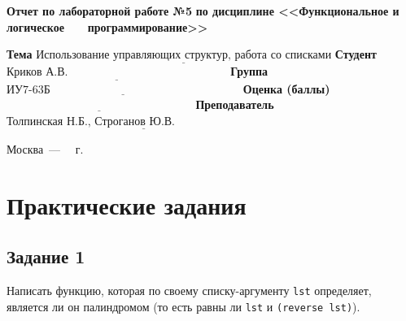 \documentclass[12pt]{report}
\begin{document}
\begin{titlepage}
		\begin{center}
			\noindent\begin{minipage}{1.1\textwidth}\centering
				\Large\textbf{  Отчет по лабораторной работе №5}\newline
				\textbf{по дисциплине <<Функциональное и логическое}\newline
				\textbf{~~~программирование>>}\newline\newline
			\end{minipage}
		\end{center}
		
		\noindent\textbf{Тема} $\underline{\text{Использование управляющих структур, работа со списками}}$\newline\newline
		\noindent\textbf{Студент} $\underline{\text{Криков А.В.~~~~~~~~~~~~~~~~~~~~~~~~~~~~~~~~~~~~~~~~~~}}$\newline\newline
		\noindent\textbf{Группа} $\underline{\text{ИУ7-63Б~~~~~~~~~~~~~~~~~~~~~~~~~~~~~~~~~~~~~~~~~~~~~~~~~~}}$\newline\newline
		\noindent\textbf{Оценка (баллы)} $\underline{\text{~~~~~~~~~~~~~~~~~~~~~~~~~~~~~~~~~~~~~~~~~~~~~~~~~}}$\newline\newline
		\noindent\textbf{Преподаватель} $\underline{\text{Толпинская Н.Б., Строганов Ю.В.~~~~~~~~~~~~~~~~~~~~~~~~~~~~}}$\newline\newline\newline
		
		\begin{center}
			\vfill
			Москва~---~\the\year
			~г.
		\end{center}
	\end{titlepage}
	
	


\chapter*{Практические задания}

	
\section*{Задание 1}
Написать функцию, которая по своему списку-аргументу \texttt{lst} определяет, является ли он палиндромом (то есть равны ли \texttt{lst} и \texttt{(reverse lst)}).
\end{document}
